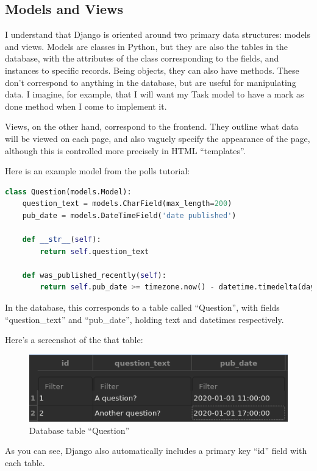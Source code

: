 \documentclass{article}
\begin{document}
\subsection{Models and Views}
I understand that Django is oriented around two primary data structures:
models and views.
Models are classes in Python,
but they are also the tables in the database,
with the attributes of the class corresponding to the fields,
and instances to specific records.
Being objects, they can also have methods.
These don't correspond to anything in the database,
but are useful for manipulating data.
I imagine, for example, that I will want my Task model to have a mark as done method when I come to implement it.

Views, on the other hand, correspond to the frontend.
They outline what data will be viewed on each page,
and also vaguely specify the appearance of the page,
although this is controlled more precisely in HTML ``templates''.

Here is an example model from the polls tutorial:
\begin{lstlisting}[language=Python]
class Question(models.Model):
    question_text = models.CharField(max_length=200)
    pub_date = models.DateTimeField('date published')

    def __str__(self):
        return self.question_text

    def was_published_recently(self):
        return self.pub_date >= timezone.now() - datetime.timedelta(days=1)
\end{lstlisting}

In the database,
this corresponds to a table called ``Question'',
with fields ``question\_text'' and ``pub\_date'',
holding text and datetimes respectively.

Here's a screenshot of the that table:

\begin{figure}[h]
	\includegraphics[width=\linewidth]{Images/question_table.png}
	\caption{Database table ``Question''}
	\label{fig:database1}
\end{figure}

As you can see,
Django also automatically includes a primary key ``id'' field with each table.
\end{document}
